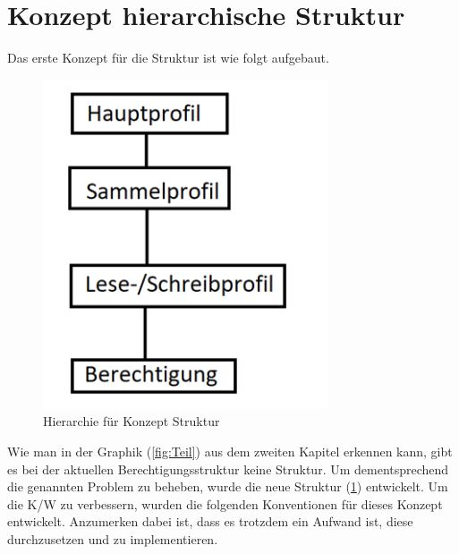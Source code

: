 \section{Konzept hierarchische Struktur}
\label{sec:chapter04:Struktur}
Das erste Konzept für die Struktur ist wie folgt aufgebaut.
\begin{figure}[h!]
 \centering
 \includegraphics[width=0.75\textwidth]{gfx/Picture/Hierarchie.PNG}
 \caption{Hierarchie für Konzept Struktur}
 \label{fig:Struktur}
\end{figure}
Wie man in der Graphik (\ref{fig:Teil}) aus dem zweiten Kapitel erkennen kann, gibt es bei der aktuellen Berechtigungsstruktur keine Struktur.
Um dementsprechend die genannten Problem zu beheben, wurde die neue Struktur (\ref{fig:Struktur}) entwickelt.
Um die \ac{K/W} zu verbessern, wurden die folgenden Konventionen für dieses Konzept entwickelt.
Anzumerken dabei ist, dass es trotzdem ein Aufwand ist, diese durchzusetzen und zu implementieren.

